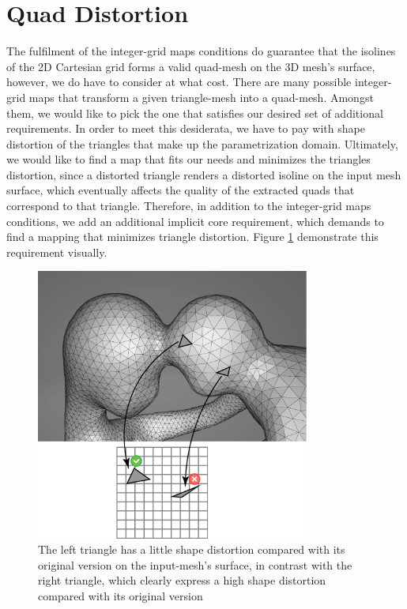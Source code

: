 \section{Quad Distortion}
\label{label:quad_distortion_cond}
The fulfilment of the integer-grid maps conditions do guarantee that the isolines of the 2D Cartesian grid forms a valid quad-mesh on the 3D mesh's surface, however, we do have to consider at what cost. There are many possible integer-grid maps that transform a given triangle-mesh into a quad-mesh. Amongst them, we would like to pick the one that satisfies our desired set of additional requirements. In order to meet this desiderata, we have to pay with shape distortion of the triangles that make up the parametrization domain. Ultimately, we would like to find a map that fits our needs and minimizes the triangles distortion, since a distorted triangle renders a distorted isoline on the input mesh surface, which eventually affects the quality of the extracted quads that correspond to that triangle. Therefore, in addition to the integer-grid maps conditions, we add an additional implicit core requirement, which demands to find a mapping that minimizes triangle distortion. Figure \ref{fig:distortion_req} demonstrate this requirement visually.
\begin{figure}[ht]
\centering
\includegraphics[width=9cm]{figures/distortion/distortion.png}
\caption[The Orientation Requirement]{The left triangle has a little shape distortion compared with its original version on the input-mesh's surface, in contrast with the right triangle, which clearly express a high shape distortion compared with its original version}
\label{fig:distortion_req}
\end{figure}
